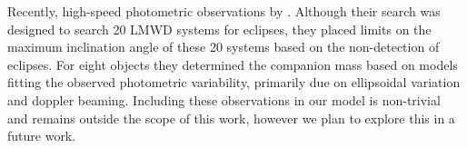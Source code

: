 \documentclass[apjl]{emulateapj}
\begin{document}
Recently, high-speed photometric observations by \citet{hermes14}. Although their search was designed to search 20 LMWD systems for eclipses, they placed limits on the maximum inclination angle of these 20 systems based on the non-detection of eclipses. For eight objects they determined the companion mass based on models fitting the observed photometric variability, primarily due on ellipsoidal variation and doppler beaming. Including these observations in our model is non-trivial and remains outside the scope of this work, however we plan to explore this in a future work.





%
% 



%
%





\end{document}
